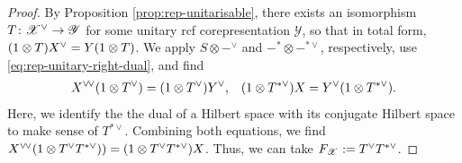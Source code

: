 \begin{proof}
  By Proposition \ref{prop:rep-unitarisable}, there exists an
  isomorphism $T \colon \mathscr{X}^{\vee} \to \mathscr{Y}$ for some
  unitary rcf corepresentation $\mathscr{Y}$, so that in total form,
  $(1\otimes T)X^{\vee} = Y(1 \otimes T)$.
We  apply   $S \otimes -^{\vee}$ and $-^{*} \otimes -^{*\vee}$,
respectively, use \eqref{eq:rep-unitary-right-dual}, and  find 
\begin{align*}
  X^{\vee}\!{}^{\vee}(1 \otimes T^{\vee}) &= (1 \otimes
  T^{\vee})Y^{\vee}, & (1 \otimes T^{*\vee})X=Y^{\vee}(1\otimes T^{*\vee}).
\end{align*}
Here, we identify the the dual of a Hilbert space with its conjugate
Hilbert space to make sense of $T^{*\vee}$.  Combining both equations, we
find $X^{\vee}\!{}^{\vee}(1 \otimes T^{\vee}T^{*\vee}))=(1 \otimes
T^{\vee}T^{*\vee})X$. Thus, we can take
$F_{\mathscr{X}}:=T^{\vee}T^{*\vee}$.
\end{proof}

